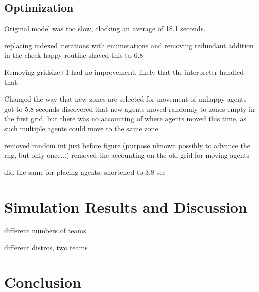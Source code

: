 \documentclass[sigplan,screen]{acmart}
\begin{document}
\subsection{Optimization}

Original model was too slow, clocking an average of 18.1 seconds.

replacing indexed iterations with enumerations and 
removing redundant addition in the check happy routine shaved this to 6.8

Removing gridsize+1 had no improvement, likely that the interpreter handled that.

Changed the way that new zones are selected for movement of unhappy agents got to 5.8 seconds
discovered that new agents moved randomly to zones empty in the first grid, but there was no accounting
of where agents moved this time, as such multiple agents could move to the same zone

removed random int just before figure (purpose uknown possibly to advance the rng, but only once...)
removed the accounting on the old grid for moving agents


did the same for placing agents, shortened to 3.8 sec


\section{Simulation Results and Discussion}

different numbers of teams

different distros, two teams



\section{Conclusion}











\end{document}
